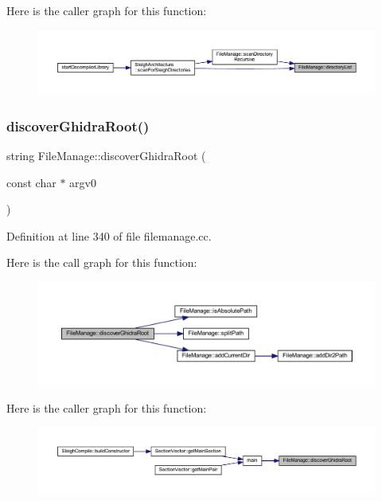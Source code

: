 Here is the caller graph for this function\+:
\nopagebreak
\begin{figure}[H]
\begin{center}
\leavevmode
\includegraphics[width=350pt]{class_file_manage_a3394b908aa55d5f59d05cfafac789259_icgraph}
\end{center}
\end{figure}
\mbox{\label{class_file_manage_a534d2dfa5b06da668dd06ea0d9596038}} 
\subsubsection{\texorpdfstring{discoverGhidraRoot()}{discoverGhidraRoot()}}
{\footnotesize\ttfamily string File\+Manage\+::discover\+Ghidra\+Root (\begin{DoxyParamCaption}\item[{const char $\ast$}]{argv0 }\end{DoxyParamCaption})\hspace{0.3cm}{\ttfamily [static]}}



Definition at line 340 of file filemanage.\+cc.

Here is the call graph for this function\+:
\nopagebreak
\begin{figure}[H]
\begin{center}
\leavevmode
\includegraphics[width=350pt]{class_file_manage_a534d2dfa5b06da668dd06ea0d9596038_cgraph}
\end{center}
\end{figure}
Here is the caller graph for this function\+:
\nopagebreak
\begin{figure}[H]
\begin{center}
\leavevmode
\includegraphics[width=350pt]{class_file_manage_a534d2dfa5b06da668dd06ea0d9596038_icgraph}
\end{center}
\end{figure}
\mbox{\label{class_file_manage_abc430305a56bcf90db9eca772676b3a6}} 
